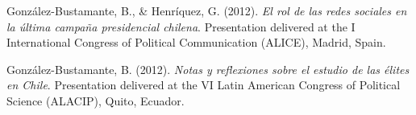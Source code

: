 \begin{publications}
\begin{benumerate}{87}

\item{González-Bustamante, B., \& Henríquez, G. (2012). {\itshape El rol de las redes sociales en la última campaña presidencial chilena}. Presentation delivered at the I International Congress of Political Communication (ALICE), Madrid, Spain.}\vspace{1mm}


\item{González-Bustamante, B. (2012). {\itshape Notas y reflexiones sobre el estudio de las élites en Chile}. Presentation delivered at the VI Latin American Congress of Political Science (ALACIP), Quito, Ecuador.}

\end{benumerate}

\end{publications}

